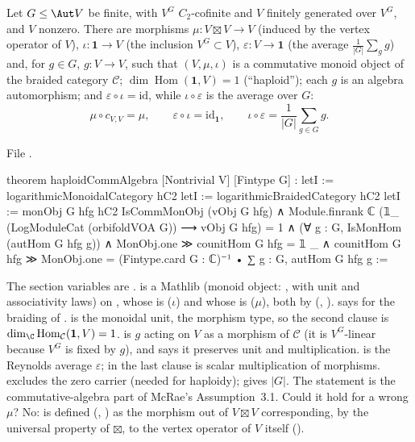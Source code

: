 \begin{theorem}\label{l22:thm:O3}
Let $G\le\Aut V$ be finite, with $V^G$ $C_2$-cofinite and $V$ finitely generated over $V^G$, and $V$ nonzero. There
are morphisms $\mu:V\boxtimes V\to V$ (induced by the vertex operator of $V$), $\iota:\mathbf 1\to V$ (the inclusion
$V^G\subset V$), $\varepsilon:V\to\mathbf 1$ (the average $\frac1{|G|}\sum_g g$) and, for $g\in G$, $g:V\to V$, such
that $(V,\mu,\iota)$ is a commutative monoid object of the braided category $\mathcal C$; $\dim\operatorname{Hom}(\mathbf
1,V)=1$ (``haploid''); each $g$ is an algebra automorphism; and $\varepsilon\circ\iota=\mathrm{id}$, while
$\iota\circ\varepsilon$ is the average over $G$:
\begin{equation*}
  \mu\circ c_{V,V}=\mu,\qquad \varepsilon\circ\iota=\mathrm{id}_{\mathbf 1},\qquad \iota\circ\varepsilon=\frac1{|G|}\sum_{g\in G}g .
\end{equation*}
\end{theorem}
\noindent File .
\begin{leancode}
theorem haploidCommAlgebra [Nontrivial V] [Fintype G] :
    letI := logarithmicMonoidalCategory hC2
    letI := logarithmicBraidedCategory hC2
    letI := monObj G hfg hC2
    IsCommMonObj (vObj G hfg) ∧
      Module.finrank ℂ (𝟙_ (LogModuleCat (orbifoldVOA G)) ⟶ vObj G hfg) = 1 ∧
      (∀ g : G, IsMonHom (autHom G hfg g)) ∧
      MonObj.one ≫ counitHom G hfg = 𝟙 _ ∧
      counitHom G hfg ≫ MonObj.one =
        (Fintype.card G : ℂ)⁻¹ • ∑ g : G, autHom G hfg g :=
\end{leancode}

\begin{dictionary}
The section variables are .  is a Mathlib  (monoid object: ,
 with unit and associativity laws) on , whose  is  ($\iota$) and whose
 is  ($\mu$), both by  (, ).  says
 for the braiding of .  is the monoidal unit,
 the morphism type, so the second clause is $\dim_{\C}\operatorname{Hom}_{\mathcal C}(\mathbf 1,V)=1$.
 is $g$ acting on $V$ as a morphism of $\mathcal C$ (it is $V^G$-linear because $V^G$ is fixed by
$g$), and  says it preserves unit and multiplication.  is the Reynolds average
$\varepsilon$; in the last clause  is scalar multiplication of morphisms. \lean{[Nontrivial V]} excludes the
zero carrier (needed for haploidy); \lean{[Fintype G]} gives $|G|$. The statement is the commutative-algebra part of
McRae's Assumption~3.1. Could it hold for a wrong $\mu$? No:  is defined (, )
as the morphism out of $V\boxtimes V$ corresponding, by the universal property of $\boxtimes$, to the vertex operator
of $V$ itself ().
\end{dictionary}

